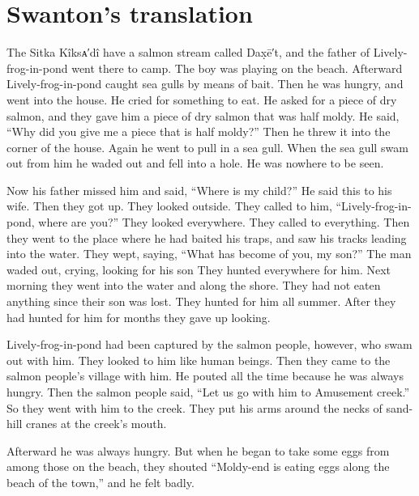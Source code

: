 \section{Swanton’s translation}\label{sec:100-swanton-translation}

The Sitka Kîksᴀ′dî have a salmon stream called Dax̣ē′t, and the father of Lively-frog-in-pond went there to camp.
The boy was playing on the beach.
Afterward Lively-frog-in-pond caught sea gulls by means of bait.
Then he was hungry, and went into the house.
He cried for something to eat.
He asked for a piece of dry salmon, and they gave him a piece of dry salmon that was half moldy.
He said, “Why did you give me a piece that is half moldy?” Then he threw it into the corner of the house.
Again he went to pull in a sea gull.
When the sea gull swam out from him he waded out and fell into a hole.
He was nowhere to be seen.

Now his father missed him and said, “Where is my child?” He said this to his wife.
Then they got up.
They looked outside.
They called to him, \qqk{}“Lively-frog-in-pond, where are you?” They looked everywhere.
They called to everything.
Then they went to the place where he had baited his traps, and saw his tracks leading into the water.
They wept, saying, \qqk{}“What has become of you, my son?” The man waded out, crying, looking for his son They hunted everywhere for him.
Next morning they went into the water and along the shore.
They had not eaten anything since their son was lost.
They hunted for him all summer.
After they had hunted for him for months they gave up looking.

Lively-frog-in-pond had been captured by the salmon people, however, who swam out with him.
They looked to him like human beings.
Then they came to the salmon people’s village with him.
He pouted all the time because he was always hungry.
Then the salmon people said, \qqk{}“Let us go with him to Amusement creek.” So they went with him to the creek.
They put his arms around the necks of sand-hill cranes at the creek’s mouth.

Afterward he was always hungry.
But when he began to take some eggs from among those on the beach, they shouted \qqk{}“Moldy-end is eating eggs along the beach of the town,” and he felt badly.


